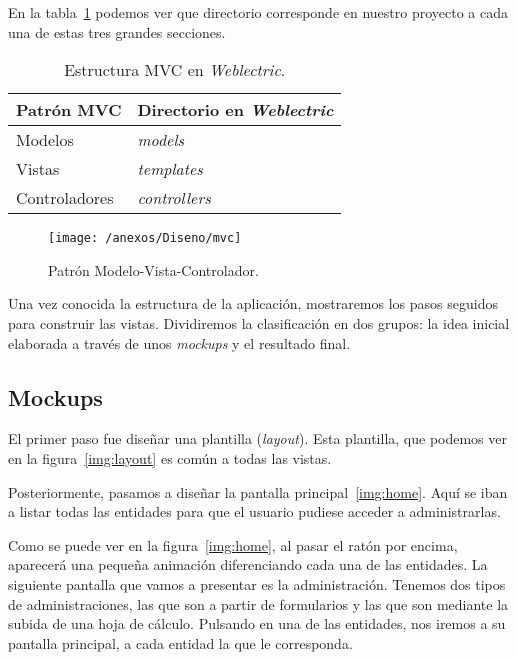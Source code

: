 En la tabla~\ref{tabla:estructuraMVC} podemos ver que directorio corresponde en nuestro proyecto a cada una de estas tres grandes secciones.

\begin{table}[h]
	\centering
	\caption{Estructura MVC en \textit{Weblectric}.}
	\label{tabla:estructuraMVC}
	\begin{tabular}{p{5cm} p{5cm}}
		\toprule
		Patrón MVC 					 & Directorio en \textit{Weblectric}  \\ \midrule
		Modelos			        	 & \textit{models} 			    \\ 
		Vistas						 & \textit{templates}		    \\
		Controladores          		 & \textit{controllers}		 	\\ \bottomrule
	\end{tabular}
\end{table}

\begin{figure}[h]
	\centering
	\texttt{[image: /anexos/Diseno/mvc]}
	\caption{Patrón Modelo-Vista-Controlador.~\cite{img:MVC}}
	\label{img:mvc}
\end{figure}

\newpage

Una vez conocida la estructura de la aplicación, mostraremos los pasos seguidos para construir las vistas. Dividiremos la clasificación en dos grupos: la idea inicial elaborada a través de unos \textit{mockups} y el resultado final.

\subsection{Mockups} 

El primer paso fue diseñar una plantilla (\textit{layout}). Esta plantilla, que podemos ver en la figura~\ref{img:layout} es común a todas las vistas.

Posteriormente, pasamos a diseñar la pantalla principal~\ref{img:home}. Aquí se iban a listar todas las entidades para que el usuario pudiese acceder a administrarlas.

Como se puede ver en la figura~\ref{img:home}, al pasar el ratón por encima, aparecerá una pequeña animación diferenciando cada una de las entidades. La siguiente pantalla que vamos a presentar es la administración. Tenemos dos tipos de administraciones, las que son a partir de formularios y las que son mediante la subida de una hoja de cálculo. Pulsando en una de las entidades, nos iremos a su pantalla principal, a cada entidad la que le corresponda. 

